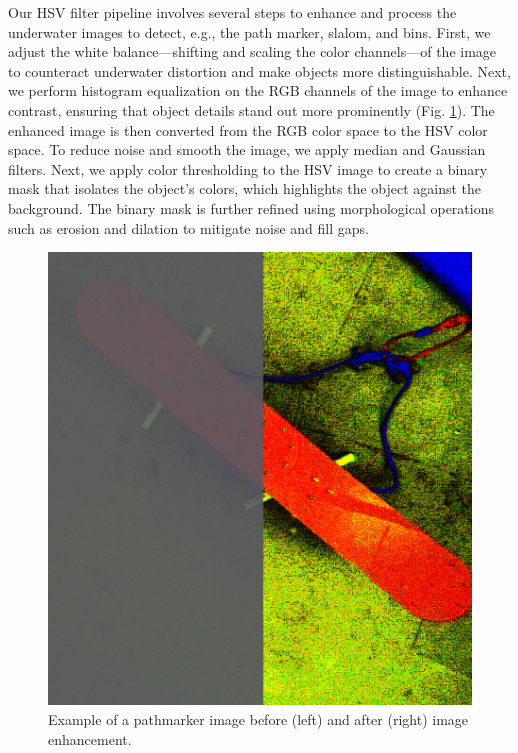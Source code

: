 \documentclass[conference]{IEEEtran}
\begin{document}
Our HSV filter pipeline involves several steps to enhance and process the underwater images to detect, e.g., the path marker, slalom, and bins. First, we adjust the white balance---shifting and scaling the color channels---of the image to counteract underwater distortion and make objects more distinguishable. Next, we perform histogram equalization on the RGB channels of the image to enhance contrast, ensuring that object details stand out more prominently (Fig. \ref{fig:enhanced_compare}). The enhanced image is then converted from the RGB color space to the HSV color space. To reduce noise and smooth the image, we apply median and Gaussian filters. Next, we apply color thresholding to the HSV image to create a binary mask that isolates the object’s colors, which highlights the object against the background. The binary mask is further refined using morphological operations such as erosion and dilation to mitigate noise and fill gaps.


\begin{figure}[htbp]
    \centerline{\includegraphics[scale=0.32]{images/pathmarker_compare.png}}
    \caption{Example of a pathmarker image before (left) and after (right) image enhancement.}
    \label{fig:enhanced_compare}
\end{figure}
\end{document}
